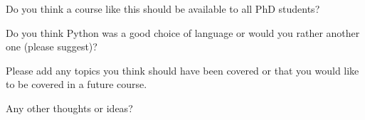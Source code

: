 \documentclass{article}
\begin{document}
Do you think a course like this should be available to all PhD students?
\vspace{ 2cm}

Do you think Python was a good choice of language or would you rather another one (please suggest)?
\vspace{ 2cm}




Please add any topics you think should have been covered or that you would like to be covered in a future course.
\vspace{ 3cm}



Any other thoughts or ideas?

\vspace{ 2cm}
\end{document}
